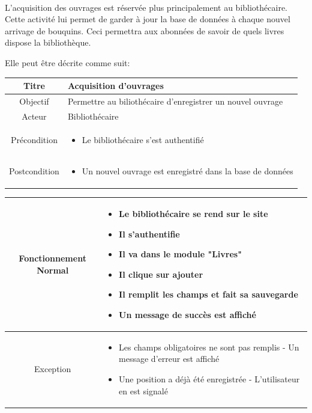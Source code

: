 \paragraph{}
L'acquisition des ouvrages est réservée plus principalement au bibliothécaire. Cette activité lui permet de garder à jour
la base de données à chaque nouvel arrivage de bouquins. Ceci permettra aux abonnées de savoir de quels livres dispose
la bibliothèque.  \par 
Elle peut être décrite comme suit: \par 
\begin{tabular}{|c|p{7cm}|}
        \hline
        Titre & Acquisition d'ouvrages  \\
        \hline
        Objectif & Permettre au biliothécaire d'enregistrer un nouvel ouvrage \\
        \hline
        Acteur & Bibliothécaire \\
        \hline
        Précondition & \begin{itemize}
                \item Le bibliothécaire s'est authentifié 
        \end{itemize} \\
        \hline
        Postcondition & \begin{itemize}
                \item Un nouvel ouvrage est enregistré dans la base de données
        \end{itemize} \\
        \hline
\end{tabular}
\par 
\begin{tabular}{|c|p{7cm}|}
        \hline
        Fonctionnement Normal & \begin{itemize}
                \item Le bibliothécaire se rend sur le site
                \item Il s'authentifie
                \item Il va dans le module "Livres"
                \item Il clique sur ajouter
                \item Il remplit les champs et fait sa sauvegarde
                \item Un message de succès est affiché
        \end{itemize} \\
        \hline
        Exception & \begin{itemize}
                \item Les champs obligatoires ne sont pas remplis - Un message d'erreur est affiché
                \item Une position a déjà été enregistrée - L'utilisateur en est signalé
        \end{itemize} \\
        \hline
\end{tabular}

